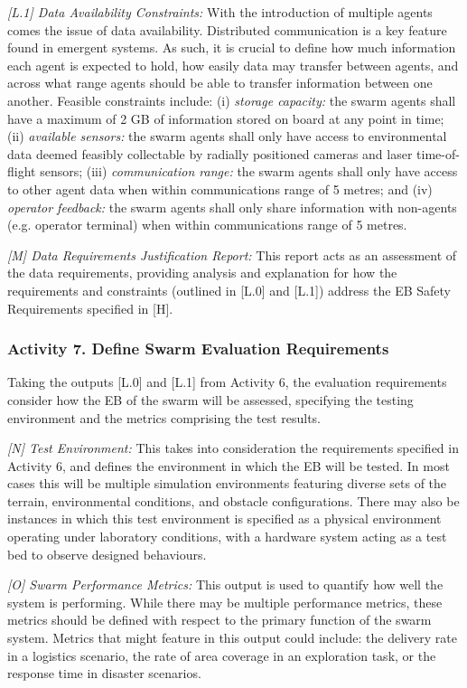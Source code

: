 \documentclass[runningheads]{llncs}
\begin{document}
\emph{[L.1] Data Availability Constraints:}
With the introduction of multiple agents comes the issue of data availability. Distributed communication is a key feature found in emergent systems. As such, it is crucial to define how much information each agent is expected to hold, how easily data may transfer between agents, and across what range agents should be able to transfer information between one another. Feasible constraints include: (i) \emph{storage capacity: }the swarm agents shall have a maximum of 2 GB of information stored on board at any point in time; (ii) \emph{available sensors:} the swarm agents shall only have access to environmental data deemed feasibly collectable by radially positioned cameras and laser time-of-flight sensors; (iii) \emph{communication range:} the swarm agents shall only have access to other agent data when within communications range of 5 metres; and (iv) \emph{operator feedback:} the swarm agents shall only share information with non-agents (e.g. operator terminal) when within communications range of 5 metres.

\emph{[M] Data Requirements Justification Report:}
This report acts as an assessment of the data requirements, providing analysis and explanation for how the requirements and constraints (outlined in [L.0] and [L.1]) address the EB Safety Requirements specified in [H].

\subsubsection*{Activity 7. Define Swarm Evaluation Requirements}

Taking the outputs [L.0] and [L.1] from Activity 6, the evaluation requirements consider how the EB of the swarm will be assessed, specifying the testing environment and the metrics comprising the test results.  

\emph{[N] Test Environment:} This takes into consideration the requirements specified in Activity 6, and defines the environment in which the EB will be tested. In most cases this will be multiple simulation environments featuring diverse sets of the terrain, environmental conditions, and obstacle configurations. There may also be instances in which this test environment is specified as a physical environment operating under laboratory conditions, with a hardware system acting as a test bed to observe designed behaviours.

\emph{[O] Swarm Performance Metrics:} This output is used to quantify how well the system is performing. While there may be multiple performance metrics, these metrics should be defined with respect to the primary function of the swarm system. Metrics that might feature in this output could include: the delivery rate in a logistics scenario, the rate of area coverage in an exploration task, or the response time in disaster scenarios.
\end{document}
